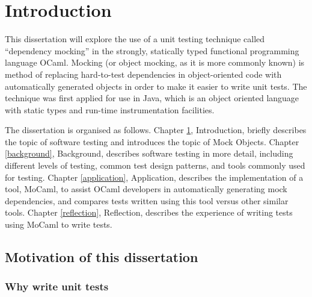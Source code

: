 \chapter{Introduction}
\label{introduction}


This dissertation will explore the use of a unit testing technique
called ``dependency mocking'' in the strongly, statically typed
functional programming language OCaml. Mocking (or object mocking, as
it is more commonly known) is method of replacing hard-to-test
dependencies in object-oriented code with automatically generated
objects in order to make it easier to write unit tests. The technique
was first applied for use in Java, which is an object oriented
language with static types and run-time instrumentation
facilities.


The dissertation is organised as follows. Chapter \ref{introduction},
Introduction, briefly describes the topic of software testing and
introduces the topic of Mock Objects. Chapter \ref{background},
Background, describes software testing in more detail, including
different levels of testing, common test design patterns, and tools
commonly used for testing. Chapter \ref{application}, Application,
describes the implementation of a tool, MoCaml, to assist OCaml
developers in automatically generating mock dependencies, and compares
tests written using this tool versus other similar tools. Chapter
\ref{reflection}, Reflection, describes the experience of writing
tests using MoCaml to write tests.

\section{Motivation of this dissertation}



\subsection{Why write unit tests}

